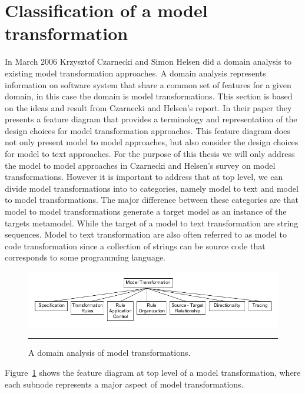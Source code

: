 \section{Classification of a model transformation}

In March 2006 Krzysztof Czarnecki and Simon Helsen did a domain analysis to
existing model transformation approaches\cite{Czarnecki2006}. A domain analysis represents
information on software system that share a common set of features for a given
domain\cite{FODA,Prieto-Diaz1990}, in this case the domain is model
transformations. This section is based on the ideas and result from Czarnecki
and Helsen's report. In their paper they presents a feature diagram that
provides a terminology and representation of the design choices for model
transformation approaches. This feature diagram does not only present model to
model approaches, but also consider the design choices for model to text
approaches. For the purpose of this thesis we will only address the model to
model approaches in Czarnecki and Helsen's survey on model transformations.
However it is important to address that at top level, we can divide model
transformations into to categories, namely model to text and model to model
transformations. The major difference between these categories are that model to
model transformations generate a target model as an instance of the targets
metamodel. While the target of a model to text transformation are string
sequences. Model to text transformation are also often referred to as model to
code transformation since a collection of strings can be source code that
corresponds to some programming language. 

\begin{figure}[H]
  \centering
    \includegraphics[scale=0.6]{./Figures/Model_Transformation_Survey.png}
    \rule{35em}{0.5pt}
  \caption[Domain Analysis of Model Transformations]
  				{A domain analysis of model transformations\cite{Czarnecki2006}.}
  \label{fig:Model_Transformation_Survey}
\end{figure}

Figure~\ref{fig:Model_Transformation_Survey} shows the feature diagram at top
level of a model transformation, where each subnode represents a major aspect
of model transformations. 

